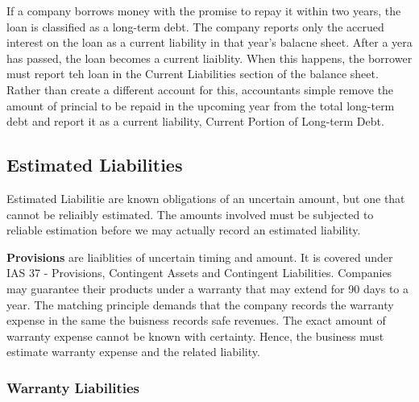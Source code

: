 \documentclass[../main.tex]{subfiles}
\begin{document}
	If a company borrows money with the promise to repay it within two years, 
	the loan is classified as a long-term debt. The company reports only the 
	accrued interest on the loan as a current liability in that year's balacne 
	sheet. After a yera has passed, the loan becomes a current liaiblity. When 
	this happens, the borrower must report teh loan in the Current Liabilities 
	section of the balance sheet. Rather than create a different account for 
	this, accountants simple remove the amount of princial to be repaid in the 
	upcoming year from the total long-term debt and report it as a current 
	liability, Current Portion of Long-term Debt.
	
	\subsection{Estimated Liabilities}
	
	Estimated Liabilitie are known obligations of an uncertain amount, but one 
	that cannot be reliaibly estimated. The amounts involved must be subjected 
	to reliable estimation before we may actually record an estimated 
	liability. 
	
	\textbf{Provisions} are liaiblities of uncertain timing and amount. It is 
	covered under IAS 37 - Provisions, Contingent Assets and Contingent 
	Liabilities. Companies may guarantee their products under a warranty that 
	may extend for 90 days to a year. The matching principle demands that the 
	company records the warranty expense in the same the buisness records safe 
	revenues. The exact amount of warranty expense cannot be known with 
	certainty. Hence, the business must estimate warranty expense and the 
	related liability.
	
	\subsubsection{Warranty Liabilities}
	
\end{document}
